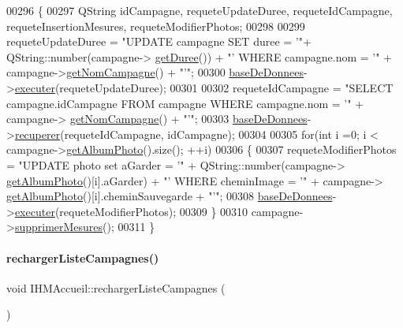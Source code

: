 \begin{DoxyCode}
00296 \{
00297     QString idCampagne, requeteUpdateDuree, requeteIdCampagne, requeteInsertionMesures, 
      requeteModifierPhotos;
00298 
00299     requeteUpdateDuree = \textcolor{stringliteral}{"UPDATE campagne SET duree = '"}+ QString::number(campagne->
      \hyperlink{class_campagne_abe02a9050f4a5ea9521dd40b855c350b}{getDuree}()) + \textcolor{stringliteral}{"' WHERE campagne.nom = '"} + campagne->\hyperlink{class_campagne_a99a682fcb8e5a3f8c2aff7a44eb2c930}{getNomCampagne}() + \textcolor{stringliteral}{"'"};
00300     \hyperlink{class_i_h_m_accueil_ab56d9846c071396a92f88272880e2c1f}{baseDeDonnees}->\hyperlink{class_base_de_donnees_aa8de5f8f8bb17edc43f5c0ee33712081}{executer}(requeteUpdateDuree);
00301 
00302     requeteIdCampagne = \textcolor{stringliteral}{"SELECT campagne.idCampagne FROM campagne WHERE campagne.nom = '"} + campagne->
      \hyperlink{class_campagne_a99a682fcb8e5a3f8c2aff7a44eb2c930}{getNomCampagne}() + \textcolor{stringliteral}{"'"};
00303     \hyperlink{class_i_h_m_accueil_ab56d9846c071396a92f88272880e2c1f}{baseDeDonnees}->\hyperlink{class_base_de_donnees_a77539baad389f5acf754cd2cd452403e}{recuperer}(requeteIdCampagne, idCampagne);
00304 
00305     \textcolor{keywordflow}{for}(\textcolor{keywordtype}{int} i =0; i < campagne->\hyperlink{class_campagne_abec90fcbc0c4ded45caaac9adb454add}{getAlbumPhoto}().size(); ++i)
00306     \{
00307         requeteModifierPhotos = \textcolor{stringliteral}{"UPDATE photo set aGarder = '"} + QString::number(campagne->
      \hyperlink{class_campagne_abec90fcbc0c4ded45caaac9adb454add}{getAlbumPhoto}()[i].aGarder) + \textcolor{stringliteral}{"' WHERE cheminImage = '"} + campagne->
      \hyperlink{class_campagne_abec90fcbc0c4ded45caaac9adb454add}{getAlbumPhoto}()[i].cheminSauvegarde + \textcolor{stringliteral}{"'"};
00308         \hyperlink{class_i_h_m_accueil_ab56d9846c071396a92f88272880e2c1f}{baseDeDonnees}->\hyperlink{class_base_de_donnees_aa8de5f8f8bb17edc43f5c0ee33712081}{executer}(requeteModifierPhotos);
00309     \}
00310     campagne->\hyperlink{class_campagne_a77066423e53f99bb6cd39fd25a6f2b5f}{supprimerMesures}();
00311 \}
\end{DoxyCode}
\mbox{\label{class_i_h_m_accueil_a44074f2d8d59e0d1b7a3d50c24d2a0df}} 
\paragraph{\texorpdfstring{recharger\+Liste\+Campagnes()}{rechargerListeCampagnes()}}
{\footnotesize\ttfamily void I\+H\+M\+Accueil\+::recharger\+Liste\+Campagnes (\begin{DoxyParamCaption}{ }\end{DoxyParamCaption})\hspace{0.3cm}{\ttfamily [private]}}



